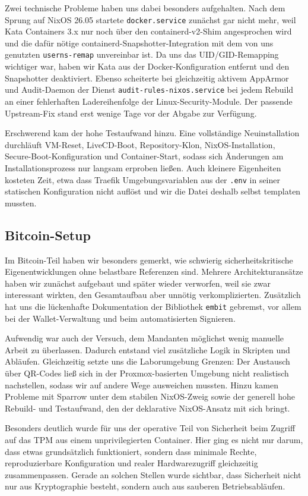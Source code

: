 Zwei technische Probleme haben uns dabei besonders aufgehalten. Nach dem Sprung auf NixOS 26.05 startete \texttt{docker.service} zunächst gar nicht mehr, weil Kata Containers 3.x nur noch über den containerd-v2-Shim angesprochen wird und die dafür nötige containerd-Snapshotter-Integration mit dem von uns genutzten \texttt{userns-remap} unvereinbar ist. Da uns das UID/GID-Remapping wichtiger war, haben wir Kata aus der Docker-Konfiguration entfernt und den Snapshotter deaktiviert. Ebenso scheiterte bei gleichzeitig aktivem AppArmor und Audit-Daemon der Dienst \texttt{audit-rules-nixos.service} bei jedem Rebuild an einer fehlerhaften Ladereihenfolge der Linux-Security-Module. Der passende Upstream-Fix stand erst wenige Tage vor der Abgabe zur Verfügung.

Erschwerend kam der hohe Testaufwand hinzu. Eine vollständige Neuinstallation durchläuft VM-Reset, LiveCD-Boot, Repository-Klon, NixOS-Installation, Secure-Boot-Konfiguration und Container-Start, sodass sich Änderungen am Installationsprozess nur langsam erproben ließen. Auch kleinere Eigenheiten kosteten Zeit, etwa dass Traefik Umgebungsvariablen aus der \texttt{.env} in seiner statischen Konfiguration nicht auflöst und wir die Datei deshalb selbst templaten mussten. 

\subsection{Bitcoin-Setup}
Im Bitcoin-Teil haben wir besonders gemerkt, wie schwierig sicherheitskritische Eigenentwicklungen ohne belastbare Referenzen sind. Mehrere Architekturansätze haben wir zunächst aufgebaut und später wieder verworfen, weil sie zwar interessant wirkten, den Gesamtaufbau aber unnötig verkomplizierten. Zusätzlich hat uns die lückenhafte Dokumentation der Bibliothek \texttt{embit} gebremst, vor allem bei der Wallet-Verwaltung und beim automatisierten Signieren.

Aufwendig war auch der Versuch, dem Mandanten möglichst wenig manuelle Arbeit zu überlassen. Dadurch entstand viel zusätzliche Logik in Skripten und Abläufen. Gleichzeitig setzte uns die Laborumgebung Grenzen: Der Austausch über QR-Codes ließ sich in der Proxmox-basierten Umgebung nicht realistisch nachstellen, sodass wir auf andere Wege ausweichen mussten. Hinzu kamen Probleme mit Sparrow unter dem stabilen NixOS-Zweig sowie der generell hohe Rebuild- und Testaufwand, den der deklarative NixOS-Ansatz mit sich bringt.

Besonders deutlich wurde für uns der operative Teil von Sicherheit beim Zugriff auf das TPM aus einem unprivilegierten Container. Hier ging es nicht nur darum, dass etwas grundsätzlich funktioniert, sondern dass minimale Rechte, reproduzierbare Konfiguration und realer Hardwarezugriff gleichzeitig zusammenpassen. Gerade an solchen Stellen wurde sichtbar, dass Sicherheit nicht nur aus Kryptographie besteht, sondern auch aus sauberen Betriebsabläufen.


